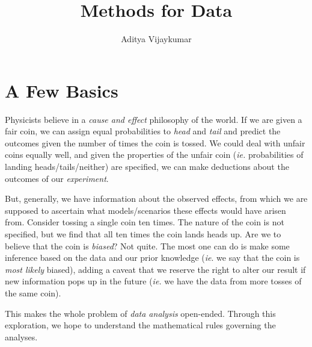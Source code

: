 \documentclass[a4paper,11pt]{article}
\title{\textbf{Methods for Data}}
\author{Aditya Vijaykumar}
\affiliation{International Centre for Theoretical Sciences, Bengaluru, India.}
\begin{document}
\maketitle
\section{A Few Basics}

Physicists believe in a \textit{cause and effect} philosophy of the world. If we are given a fair coin, we can assign equal probabilities to \textit{head} and \textit{tail} and predict the outcomes given the number of times the coin is tossed. We could deal with unfair coins equally well, and given the properties of the unfair coin  (\textit{ie.} probabilities of landing heads/tails/neither) are specified, we can make deductions about the outcomes of our \textit{experiment}.

But, generally, we have information about the observed effects, from which we are supposed to ascertain what models/scenarios these effects would have arisen from. Consider tossing a single coin ten times. The nature of the coin is not specified, but we find that all ten times the coin lands heads up. Are we to believe that the coin is \textit{biased}? Not quite. The most one can do is make some inference based on the data and our prior knowledge (\textit{ie}. we say that the coin is \textit{most likely} biased), adding a caveat that we reserve the right to alter our result if new information pops up in the future (\textit{ie.} we have the data from more tosses of the same coin).

This makes the whole problem of \textit{data analysis} open-ended. Through this exploration, we hope to understand the mathematical rules governing the analyses.
\end{document}
